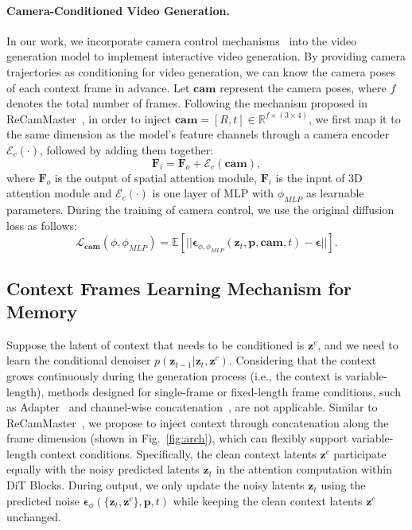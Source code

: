 \paragraph{Camera-Conditioned Video Generation.} In our work, we incorporate camera control mechanisms~\cite{motionctrl,recammaster} into the video generation model to implement interactive video generation. 
By providing camera trajectories as conditioning for video generation, we can know the camera poses of each context frame in advance. 
Let $\mathbf{cam}$ represent the camera poses, where $f$ denotes the total number of frames. Following the mechanism proposed in ReCamMaster~\cite{recammaster}, in order to inject $\mathbf{cam}=[R,t]\in\mathbb{R}^{f\times(3\times4)}$, we first map it to the same dimension as the model's feature channels through a camera encoder $\mathcal{E}_{c}(\cdot)$, followed by adding them together:
\begin{equation}
    \mathbf{F}_i = \mathbf{F}_o + \mathcal{E}_{c}(\mathbf{cam}),
\end{equation}
where $\mathbf{F}_o$ is the output of spatial attention module, $\mathbf{F}_i$ is the input of 3D attention module and $\mathcal{E}_c(\cdot)$ is one layer of MLP with $\phi_{MLP}$ as learnable parameters. During the training of camera control, we use the original diffusion loss as follows:
\begin{equation}
    \mathcal{L}_{\mathbf{cam}}(\phi,\phi_{MLP})=\mathbb{E}[||\boldsymbol{\epsilon}_{\phi,\phi_{MLP}}(\mathbf{z}_t,\mathbf{p},\mathbf{cam},t)-\boldsymbol{\epsilon}||].
\end{equation}


\subsection{Context Frames Learning Mechanism for Memory}
\label{subsec:inject_context}
Suppose the latent of context that needs to be conditioned is $\mathbf{z}^{c}$, and we need to learn the conditional denoiser $p(\mathbf{z}_{t-1}|\mathbf{z}_t,\mathbf{z}^{c})$.
Considering that the context grows continuously during the generation process (i.e., the context is variable-length), methods designed for single-frame or fixed-length frame conditions, such as Adapter~\cite{controlnet,t2iadapter} and channel-wise concatenation~\cite{dynamicrafter}, are not applicable. Similar to ReCamMaster~\cite{recammaster}, we propose to inject context through concatenation along the frame dimension (shown in Fig.~\ref{fig:arch}), which can flexibly support variable-length context conditions. Specifically, the clean context latents $\mathbf{z}^c$ participate equally with the noisy predicted latents $\mathbf{z}_t$ in the attention computation within DiT Blocks. During output, we only update the noisy latents $\mathbf{z}_t$ using the predicted noise $\boldsymbol{\epsilon}_{\phi}(\{\mathbf{z}_t,\mathbf{z}^c\},\mathbf{p},t)$ while keeping the clean context latents $\mathbf{z}^c$ unchanged.

